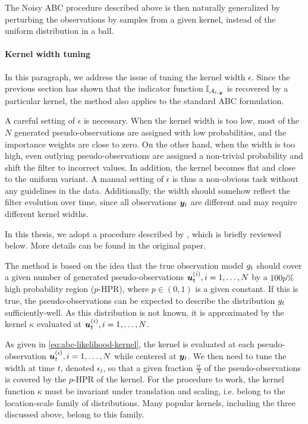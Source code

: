 The Noisy ABC procedure described above is then naturally generalized by perturbing the observations by samples from a given kernel, instead of the uniform distribution in a ball.


\paragraph{Kernel width tuning}
In this paragraph, we address the issue of tuning the kernel width $\epsilon$. Since the previous section has shown that the indicator function $\mathbb{I}_{\mathcal{A}_{\epsilon, \bm{y}}}$ is recovered by a particular kernel, the method also applies to the standard ABC formulation.

A careful setting of $\epsilon$ is necessary. When the kernel width is too low, most of the $N$ generated pseudo-observations are assigned with low probabilities, and the importance weights are close to zero. On the other hand, when the width is too high, even outlying pseudo-observations are assigned a non-trivial probability and shift the filter to incorrect values. In addition, the kernel becomes flat and close to the uniform variant. A manual setting of $\epsilon$ is thus a non-obvious task without any guidelines in the data. Additionally, the width should somehow reflect the filter evolution over time, since all observations $\bm{y}_t$ are different and may require different kernel widths.

In this thesis, we adopt a procedure described by \cite{dedecius}, which is briefly reviewed below. More details can be found in the original paper.

The method is based on the idea that the true observation model $g_t$ should cover a given number of generated pseudo-observations $\bm{u}_t^{(i)}, i = 1, \ldots, N$ by a $100p\%$ high probability region ($p$-HPR), where $p \in \left(0, 1\right)$ is a given constant. If this is true, the pseudo-observations can be expected to describe the distribution $g_t$ sufficiently-well. As this distribution is not known, it is approximated by the kernel $\kappa$ evaluated at $\bm{u}_t^{(i)}, i = 1, \ldots, N$.

As given in \eqref{eq:abc-likelihood-kernel}, the kernel is evaluated at each pseudo-observation $\bm{u}_t^{(i)}, i = 1, \ldots, N$ while centered at $\bm{y}_t$. We then need to tune the width at time $t$, denoted $\epsilon_t$, so that a given fraction $\frac{\alpha}{N}$ of the pseudo-observations is covered by the $p$-HPR of the kernel. For the procedure to work, the kernel function $\kappa$ must be invariant under translation and scaling, i.e. belong to the location-scale family of distributions. Many popular kernels, including the three discussed above, belong to this family.

